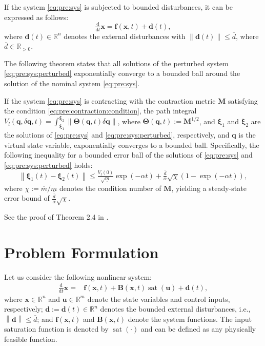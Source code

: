 \documentclass{ifacconf}
\newcommand\ie{\textrm{i.e.,\ }}
\newcommand\R{\mathbb{R}}
\newcommand*{\mv}[1]{\boldsymbol{#1}} %
\newcommand*{\mm}[1]{\boldsymbol{#1}} %
\newcommand*{\norm}[1]{\left\lVert #1 \right\rVert} %
\DeclareMathOperator{\mysat}{{sat}}       %
\newcommand\der{\mathrm d}
\newcommand*{\ddtt}{
   \tfrac{\der}{\der t}
}
\begin{document}
If the system \eqref{eq:pre:sys} is subjected to bounded disturbances, it can be expressed as follows:
\begin{equation} \label{eq:pre:sys:perturbed}
   \ddtt\mv{x}
   =
   \mv{f}(\mv{x},t)
   +
   \mv{d}(t)
   , 
\end{equation}
where $\mv{d}(t)\in\R^n$ denotes the external disturbances with $\norm{\mv{d}(t)}\leq \overline{d}$, where $\overline{d}\in\R_{>0}$.

The following theorem states that all solutions of the perturbed system \eqref{eq:pre:sys:perturbed} exponentially converge to a bounded ball around the solution of the nominal system \eqref{eq:pre:sys}.
\begin{thm} \label{thm:contraction:perturbed}
   If the system \eqref{eq:pre:sys} is contracting with the contraction metric $\mm{M}$ satisfying the condition \eqref{eq:pre:contraction:condition}, the path integral $V_l(\mv{q},\delta\mv{q},t)=\int_{\mv{\xi}_1}^{\mv{\xi}_2}\norm{\mm{\Theta}(\mv{q},t)\delta\mv{q}}$, where $\mm{\Theta}(\mv{q},t):=\mm{M}^{1/2}$, and $\mv{\xi}_1$ and $\mv{\xi}_2$ are the solutions of \eqref{eq:pre:sys} and \eqref{eq:pre:sys:perturbed}, respectively, and $\mv{q}$ is the virtual state variable, exponentially converges to a bounded ball. 
   Specifically, the following inequality for a bounded error ball of the solutions of \eqref{eq:pre:sys} and \eqref{eq:pre:sys:perturbed} holds:
   \begin{equation}
      \norm{\mv\xi_1(t)-\mv\xi_2(t)}
      \le
      \tfrac{V_{l}(0)}{\sqrt{\underline{m}}}
      \exp(-\alpha t)
      +
      \tfrac{\overline d}{\alpha}
      \sqrt{\chi}
      (1-\exp(-\alpha t))
      ,
   \end{equation}
   where $\chi:=\overline{m}/\underline{m}$ denotes the condition number of $\mm{M}$, yielding a steady-state error bound of $\tfrac{\overline d}{\alpha}\sqrt{\chi}$.
\end{thm}

\begin{pf}
   See the proof of Theorem 2.4 in \cite{Tsukamoto:2021aa}.
\end{pf}

\section{Problem Formulation} \label{sec:problem}

Let us consider the following nonlinear system:
\begin{equation} \label{eq:sys}
   \begin{aligned}   
      \ddtt{\mv{x}}
      =&
      \mv{f}(\mv{x},t)
      +
      \mm{B}(\mv{x},t)
      \mysat(\mv{u})   
      +
      \mv{d}(t)
      ,
   \end{aligned}
\end{equation}
where $\mv{x}\in\R^n$ and $\mv{u}\in\R^m$ denote the state variables and control inputs, respectively; $\mv{d}:=\mv{d}(t)\in\R^n$ denotes the bounded external disturbances, \ie $\norm{\mv{d}} \leq \overline{d}$; and $\mv{f}(\mv{x},t)$ and $\mm{B}(\mv{x},t)$ denote the system functions.
The input saturation function is denoted by $\mysat(\cdot)$ and can be defined as any physically feasible function.
\end{document}
